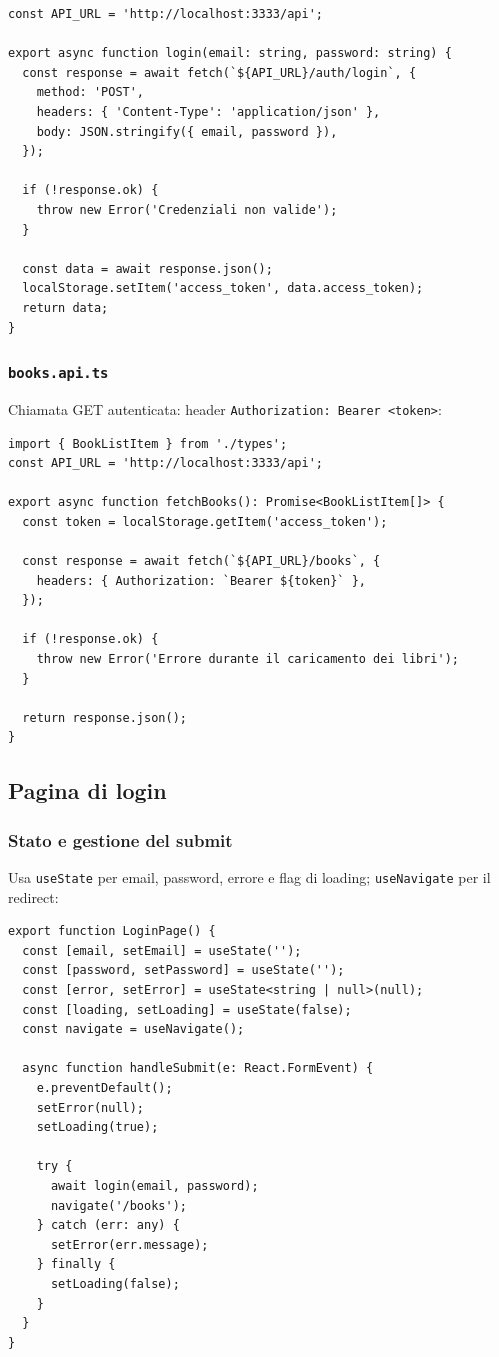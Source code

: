 \documentclass[11pt,a4paper]{article}
\begin{document}
\begin{lstlisting}[language=tsx]
const API_URL = 'http://localhost:3333/api';

export async function login(email: string, password: string) {
  const response = await fetch(`${API_URL}/auth/login`, {
    method: 'POST',
    headers: { 'Content-Type': 'application/json' },
    body: JSON.stringify({ email, password }),
  });

  if (!response.ok) {
    throw new Error('Credenziali non valide');
  }

  const data = await response.json();
  localStorage.setItem('access_token', data.access_token);
  return data;
}
\end{lstlisting}

\subsubsection{\texttt{books.api.ts}}
Chiamata GET autenticata: header \texttt{Authorization: Bearer <token>}:

\begin{lstlisting}[language=tsx]
import { BookListItem } from './types';
const API_URL = 'http://localhost:3333/api';

export async function fetchBooks(): Promise<BookListItem[]> {
  const token = localStorage.getItem('access_token');

  const response = await fetch(`${API_URL}/books`, {
    headers: { Authorization: `Bearer ${token}` },
  });

  if (!response.ok) {
    throw new Error('Errore durante il caricamento dei libri');
  }

  return response.json();
}
\end{lstlisting}

\subsection{Pagina di login}

\subsubsection{Stato e gestione del submit}
Usa \texttt{useState} per email, password, errore e flag di loading; \texttt{useNavigate} per il redirect:

\begin{lstlisting}[language=tsx]
export function LoginPage() {
  const [email, setEmail] = useState('');
  const [password, setPassword] = useState('');
  const [error, setError] = useState<string | null>(null);
  const [loading, setLoading] = useState(false);
  const navigate = useNavigate();

  async function handleSubmit(e: React.FormEvent) {
    e.preventDefault();
    setError(null);
    setLoading(true);

    try {
      await login(email, password);
      navigate('/books');
    } catch (err: any) {
      setError(err.message);
    } finally {
      setLoading(false);
    }
  }
}
\end{lstlisting}
\end{document}
